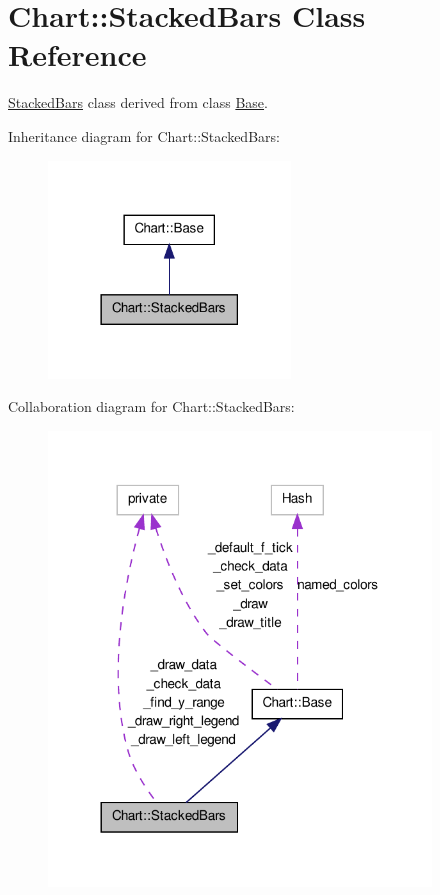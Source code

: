 \hypertarget{classChart_1_1StackedBars}{
\section{Chart::StackedBars Class Reference}
\label{classChart_1_1StackedBars}
}


\hyperlink{classChart_1_1StackedBars}{StackedBars} class derived from class \hyperlink{classChart_1_1Base}{Base}.  




Inheritance diagram for Chart::StackedBars:\nopagebreak
\begin{figure}[H]
\begin{center}
\leavevmode
\includegraphics[width=182pt]{classChart_1_1StackedBars__inherit__graph}
\end{center}
\end{figure}


Collaboration diagram for Chart::StackedBars:\nopagebreak
\begin{figure}[H]
\begin{center}
\leavevmode
\includegraphics[width=288pt]{classChart_1_1StackedBars__coll__graph}
\end{center}
\end{figure}
